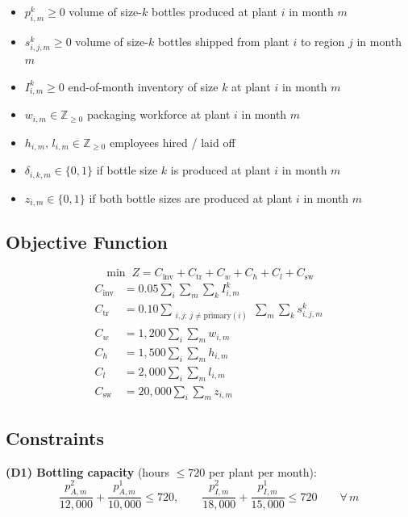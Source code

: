 \documentclass[12pt,a4paper]{article}
\begin{document}
\begin{itemize}
  \item $p^{k}_{i,m}\geq0$ \quad volume of size-$k$ bottles produced at plant $i$ in month $m$
  \item $s^{k}_{i,j,m}\geq0$ \quad volume of size-$k$ bottles shipped from plant $i$ to region $j$ in month $m$
  \item $I^{k}_{i,m}\geq0$ \quad end-of-month inventory of size $k$ at plant $i$ in month $m$
  \item $w_{i,m}\in\mathbb{Z}_{\geq0}$ \quad packaging workforce at plant $i$ in month $m$
  \item $h_{i,m},\,l_{i,m}\in\mathbb{Z}_{\geq0}$ \quad employees hired / laid off
  \item $\delta_{i,k,m}\in\{0,1\}$  if bottle size $k$ is produced at plant $i$ in month $m$
  \item $z_{i,m}\in\{0,1\}$  if both bottle sizes are produced at plant $i$ in month $m$
\end{itemize}

\subsection*{Objective Function}

\[
\min\;Z = C_{\mathrm{inv}}+C_{\mathrm{tr}}+C_w+C_h+C_l+C_{\mathrm{sw}}
\]
\begin{align*}
C_{\mathrm{inv}} &= 0.05\sum_{i}\sum_{m}\sum_{k}I^{k}_{i,m} \\
C_{\mathrm{tr}}  &= 0.10\!\!\!\sum_{\substack{i,j:\,j\neq\mathrm{primary}(i)}}\sum_{m}\sum_{k}s^{k}_{i,j,m} \\
C_w  &= 1{,}200\sum_{i}\sum_{m}w_{i,m} \\
C_h  &= 1{,}500\sum_{i}\sum_{m}h_{i,m} \\
C_l  &= 2{,}000\sum_{i}\sum_{m}l_{i,m} \\
C_{\mathrm{sw}} &= 20{,}000\sum_{i}\sum_{m}z_{i,m}
\end{align*}

\subsection*{Constraints}

\textbf{(D1) Bottling capacity} (hours $\leq720$ per plant per month):
\[
  \frac{p^2_{A,m}}{12{,}000}+\frac{p^1_{A,m}}{10{,}000}\leq720,
  \qquad
  \frac{p^2_{I,m}}{18{,}000}+\frac{p^1_{I,m}}{15{,}000}\leq720
  \qquad\forall\,m
\]
\end{document}

